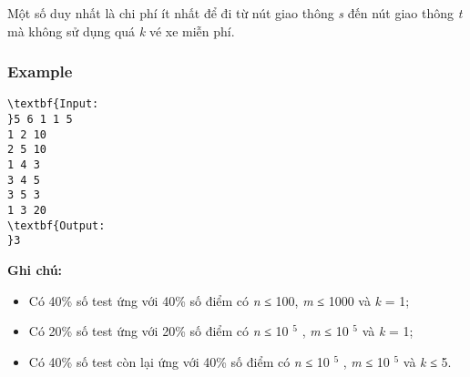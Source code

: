 Một số duy nhất là chi phí ít nhất để đi từ nút giao thông \emph{ s } đến nút giao thông \emph{ t } mà không sử dụng quá \emph{ k } vé xe miễn phí.

\subsubsection{Example}
\begin{verbatim}
\textbf{Input:
}5 6 1 1 5
1 2 10
2 5 10
1 4 3
3 4 5
3 5 3
1 3 20
\textbf{Output:
}3\end{verbatim}

\textbf{Ghi chú: }
\begin{itemize}
	\item Có 40\% số test ứng với 40\% số điểm có \emph{ n } ≤ 100, \emph{ m } ≤ 1000 và \emph{ k } = 1;
	\item Có 20\% số test ứng với 20\% số điểm có \emph{ n } ≤ 10 $^ 5 $ , \emph{ m } ≤ 10 $^ 5 $ và \emph{ k } = 1;
	\item Có 40\% số test còn lại ứng với 40\% số điểm có \emph{ n } ≤ 10 $^ 5 $ , \emph{ m } ≤ 10 $^ 5 $ và \emph{ k } ≤ 5.
\end{itemize}
